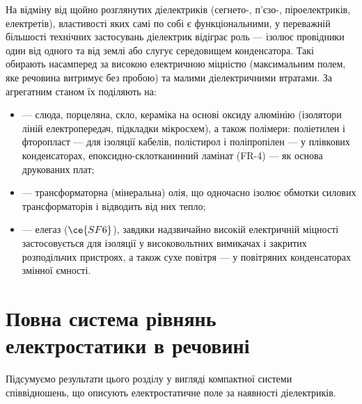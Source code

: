 На відміну від щойно розглянутих  діелектриків (сегнето-, п'єзо-, піроелектриків, електретів), властивості яких самі по собі є
функціональними, у переважній більшості технічних застосувань діелектрик відіграє  роль --- ізолює провідники один від одного та від
землі або слугує середовищем конденсатора. Такі  обирають насамперед за високою електричною міцністю (максимальним
полем, яке речовина витримує без пробою) та малими діелектричними втратами. За агрегатним станом їх поділяють на:
\begin{itemize}
	\item {} --- слюда, порцеляна, скло, кераміка на основі оксиду алюмінію (ізолятори ліній електропередач, підкладки мікросхем), а
	      також полімери: поліетилен і фторопласт --- для ізоляції кабелів, полістирол і поліпропілен --- у плівкових конденсаторах,
	      епоксидно-склотканинний ламінат (FR-4) --- як основа друкованих плат;
	\item {} --- трансформаторна (мінеральна) олія, що одночасно ізолює обмотки силових трансформаторів і відводить від них тепло;
	\item {} --- елегаз ($\ce{SF6}$), завдяки надзвичайно високій електричній міцності застосовується для ізоляції у
	      високовольтних вимикачах і закритих розподільчих пристроях, а також сухе повітря --- у повітряних конденсаторах змінної ємності.
\end{itemize}

\section{Повна система рівнянь електростатики в речовині}

Підсумуємо результати цього розділу у вигляді компактної системи співвідношень, що описують електростатичне поле за наявності діелектриків.

